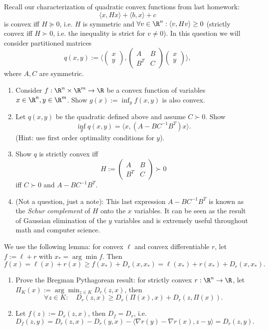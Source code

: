 \documentclass[addpoints,12pt,A4]{exam}
\begin{document}
\begin{questions}
 \question
 Recall our characterization of quadratic convex functions from last homework:
 \[ \langle x, H x \rangle + \langle b, x \rangle + c  \]
 is convex iff $H \succeq 0$, i.e. $H$ is symmetric and $\forall v \in \R^{n}: \langle v, H v \rangle \geq 0$ (strictly convex iff $H \succ 0$, i.e. the inequality is strict for $v \neq 0$). In this question we will consider partitioned matrices
 \[ q(x,y) := \bigg\langle \begin{pmatrix} x \\ y \end{pmatrix},  \begin{pmatrix}
     A & B \\ B^{T} & C
 \end{pmatrix} \begin{pmatrix} x \\ y \end{pmatrix} \bigg\rangle ,  \]
 where $A, C$ are symmetric. 
 \begin{enumerate}
     \item Consider $f : \R^{n} \times \R^{m} \to \R$ be a convex function of variables $x \in \R^{n}, y \in \R^{m}$. Show $g(x) := \inf_{y} f(x,y)$ is also convex. 
     \item Let $q(x,y)$ be the quadratic defined above and assume $C \succ 0$. Show 
     \[ \inf_{y} q(x,y) = \langle x, (A - B C^{-1} B^{T}) x \rangle .  \]
     (Hint: use first order optimality conditions for $y$). 
     \item Show $q$ is strictly convex iff 
     \[ H := \begin{pmatrix}
     A & B \\ B^{T} & C
 \end{pmatrix} \succ 0 \]
 iff $C \succ 0$ and $A - B C^{-1} B^{T}$. 
 \item (Not a question, just a note): This last expression $A - B C^{-1} B^{T}$ is known as the \emph{Schur complement} of $H$ onto the $x$ variables. It can be seen as the result of Gaussian elimination of the $y$ variables and is extremely useful throughout math and computer science. 
 \end{enumerate}
 \begin{solution}
 \end{solution}
 

\question
We use the following lemma: for convex $\ell$ and convex differentiable $r$, let $f := \ell + r$ with $x_{*} = \arg\min f$. Then 
\[ f(x) = \ell(x) + r(x) \geq f(x_{*}) + D_{r}(x,x_{*}) = \ell(x_{*}) + r(x_{*}) + D_{r}(x,x_{*}) .    \]
\begin{enumerate}
\item Prove the Bregman Pythagorean result: for strictly convex $r : \R^{n} \to \R$, let $\Pi_{K}(x) := \arg\min_{z \in K} D_{r}(z,x)$, then 
\[ \forall z \in K: \quad D_{r}(z, x) \geq D_{r}(\Pi(x), x) + D_{r}(z, \Pi(x)) .    \]
\item Let $f(z) := D_{r}(z,x)$, then $D_{f} = D_{r}$, i.e. 
\[ D_{f}(z,y) = D_{r}(z,x) - D_{r}(y,x) - \langle \nabla r(y) - \nabla r(x), z - y \rangle = D_{r}(z,y) .   \]
\end{enumerate} 


\end{questions}
\end{document}
